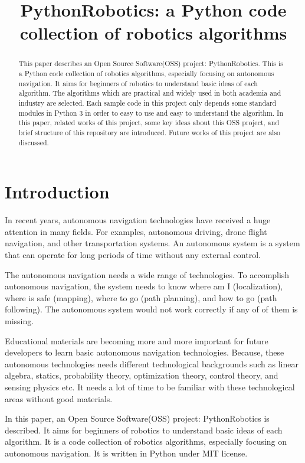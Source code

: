 \documentclass{bmvc2k}
\title{PythonRobotics: a Python code collection of robotics algorithms}
\begin{document}
\maketitle

\begin{abstract}
This paper describes an Open Source Software(OSS) project: PythonRobotics\cite{github}.
This is a Python code collection of robotics algorithms, especially focusing on autonomous navigation.
It aims for beginners of robotics to understand basic ideas of each algorithm.
The algorithms which are practical and widely used in both academia and industry are selected.
Each sample code in this project only depends some standard modules in Python 3 in order to easy to use and easy to understand the algorithm.
In this paper, related works of this project, some key ideas about this OSS project, and brief structure of this repository are introduced.
Future works of this project are also discussed. 

\end{abstract}

\section{Introduction}

In recent years, autonomous navigation technologies have received a huge attention in many fields. 
For examples, autonomous driving\cite{pathplanning}, drone flight navigation, and other transportation systems.
An autonomous system is a system that can operate for long periods of time without any external control.

The autonomous navigation needs a wide range of technologies.
To accomplish autonomous navigation, the system needs to know where am I (localization), where is safe (mapping), where to go (path planning), and how to go (path following). 
The autonomous system would not work correctly if any of of them is missing.

Educational materials are becoming more and more important for future developers to learn basic autonomous navigation technologies.
Because, these autonomous technologies needs different technological backgrounds such as linear algebra, statics, probability theory, optimization theory, control theory, and sensing physics etc. 
It needs a lot of time to be familiar with these technological areas without good materials.

In this paper, an Open Source Software(OSS) project: PythonRobotics\cite{github} is described.
It aims for beginners of robotics to understand basic ideas of each algorithm.
It is a code collection of robotics algorithms, especially focusing on autonomous navigation. It is written in Python\cite{python} under MIT license\cite{mit}. 
\end{document}
